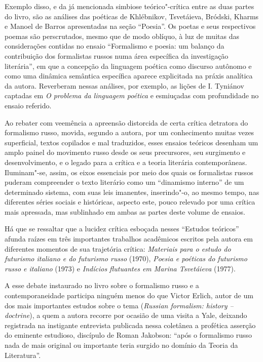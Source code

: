 Exemplo disso, e da já mencionada simbiose teórico"-crítica entre as duas
partes do livro, são as análises das poéticas de Khlébnikov, Tsvetáieva,
Bródski, Kharms e Manoel de Barros apresentadas na seção ``Poesia''. Os
poetas e seus respectivos poemas são perscrutados, mesmo que de modo
oblíquo, à luz de muitas das considerações contidas no ensaio
``Formalismo e poesia: um balanço da contribuição dos formalistas
russos numa área específica da investigação literária'', em que a
concepção da linguagem poética como discurso autônomo e como uma
dinâmica semântica específica aparece explicitada na práxis analítica da
autora. Reverberam nessas análises, por exemplo, as lições de I.
Tyniánov captadas em \emph{O problema da linguagem poética} e
esmiuçadas com profundidade no ensaio referido.

Ao rebater com veemência a apreensão distorcida de certa crítica
detratora do formalismo russo, movida, segundo a autora, por um
conhecimento muitas vezes superficial, textos copilados e mal
traduzidos, esses ensaios teóricos desenham um amplo painel do movimento
russo desde os seus precursores, seu surgimento e desenvolvimento, e o
legado para a crítica e a teoria literária contemporâneas. Iluminam"-se,
assim, os eixos essenciais por meio dos quais os formalistas russos
puderam compreender o texto literário como um ``dinamismo interno'' de
um determinado sistema, com suas leis imanentes, inserindo"-o, ao mesmo
tempo, nas diferentes séries sociais e históricas, aspecto este, pouco
relevado por uma crítica mais apressada, mas sublinhado em ambas as
partes deste volume de ensaios.

Há que se ressaltar que a lucidez crítica esboçada nesses ``Estudos
teóricos'' afunda raízes em três importantes trabalhos acadêmicos
escritos pela autora em diferentes momentos de sua trajetória crítica:
\emph{Materiais para o estudo do futurismo italiano e do futurismo russo}
(1970), \emph{Poesia e poéticas do futurismo russo e italiano} (1973) e
\emph{Indícios flutuantes em Marina Tsvetáieva} (1977).

A esse debate instaurado no livro sobre o formalismo russo e a
contemporaneidade participa ninguém menos do que Victor Erlich, autor de
um dos mais importantes estudos sobre o tema (\emph{Russian formalism:
history -- doctrine}), a quem a autora recorre por ocasião de uma visita
a Yale, deixando registrada na instigante entrevista publicada nessa
coletânea a profética asserção do eminente estudioso, discípulo de Roman
Jakobson: ``após o formalismo russo nada de mais original ou importante
teria surgido no domínio da Teoria da Literatura''.

